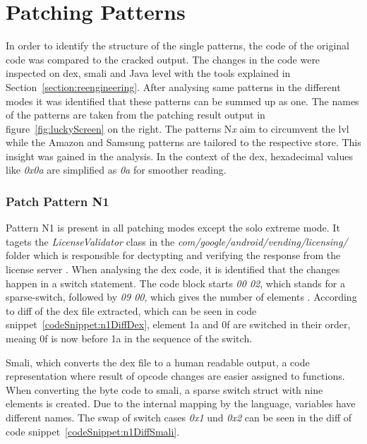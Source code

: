 \section{Patching Patterns} \label{section:luckypatcher-patterns}
In order to identify the structure of the single patterns, the code of the original code was compared to the cracked output.
The changes in the code were inspected on dex, smali and Java level with the tools explained in Section~\ref{section:reengineering}.
After analysing same patterns in the different modes it was identified that these patterns can be summed up as one.
\newline
The names of the patterns are taken from the patching result output in figure~\ref{fig:luckyScreen} on the right.
The patterns N\textit{x} aim to circumvent the \gls{lvl} while the Amazon and Samsung patterns are tailored to the respective store.
This insight was gained in the analysis.
In the context of the \gls{dex}, hexadecimal values like \textit{0x0a} are simplified as \textit{0a} for smoother reading.
\subsubsection{Patch Pattern N1}
Pattern N1 is present in all patching modes except the solo extreme mode.
It tagets the \textit{LicenseValidator} class in the \textit{com/google/android/vending/licensing/} folder which is responsible for dectypting and verifying the response from the license server \cite{developersLicensingReference}.
\newline
When analysing the dex code, it is identified that the changes happen in a switch statement.
The code block starts \textit{00 02}, which stands for a sparse-switch, followed by \textit{09 00}, which gives the number of elements \cite{opcodes}.
According to diff of the \gls{dex} file extracted, which can be seen in code snippet~\ref{codeSnippet:n1DiffDex}, element 1a and 0f are switched in their order, meaing 0f is now before 1a in the sequence of the switch.
\newline


Smali, which converts the \gls{dex} file to a human readable output, a code representation where result of opcode changes are easier assigned to functions.
When converting the byte code to smali, a sparse switch struct with nine elements is created.
Due to the internal mapping by the language, variables have different names.
The swap of switch cases \textit{0x1} und \textit{0x2} can be seen in the diff of code snippet~\ref{codeSnippet:n1DiffSmali}.
\newline


